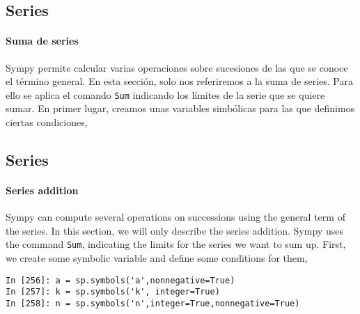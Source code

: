 \begin{paracol}{2}
\subsection{Series} 

\paragraph{Suma de series} Sympy permite calcular varias operaciones sobre sucesiones de las que se conoce el término general. En esta sección, solo nos referiremos a la suma de series. 
Para ello se aplica el comando \texttt{Sum} indicando los límites de la serie que se quiere sumar. En primer lugar, creamos unas variables simbólicas para las que definimos ciertas condiciones,
\subsection{Series}

\paragraph{Series addition} Sympy can compute several operations on successions using the general term of the series. In this section, we will only describe the series addition. Sympy uses the command \texttt{Sum}, indicating the limits for the series we want to sum up. First, we create some symbolic variable and define some conditions for them,


\end{paracol}
\begin{center}
	\begin{minipage}{.7\textwidth}
		\begin{verbatim}
In [256]: a = sp.symbols('a',nonnegative=True)
In [257]: k = sp.symbols('k', integer=True)
In [258]: n = sp.symbols('n',integer=True,nonnegative=True)
		\end{verbatim}
	\end{minipage}
\end{center}

